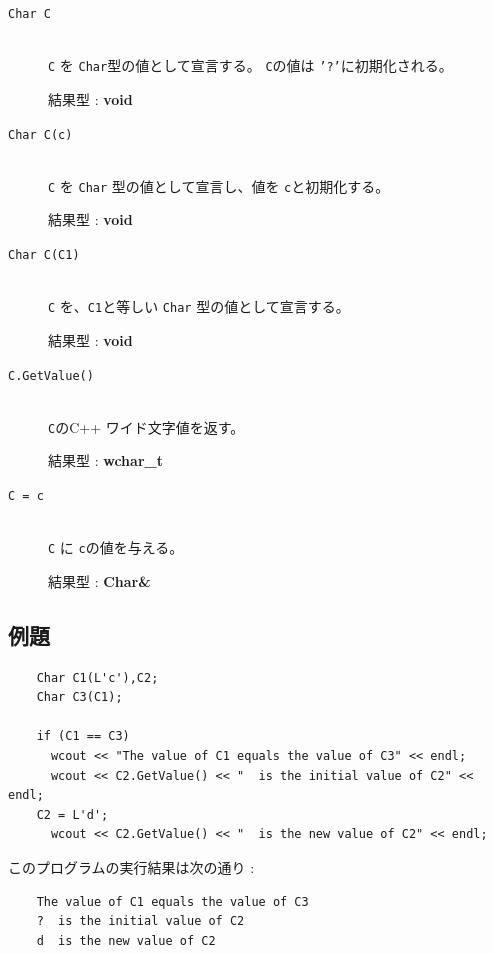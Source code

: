 \documentclass[\pformat,12pt]{jarticle}
\begin{document}
\vspace{0.5cm}

\begin{description}
\item[{\tt Char C}] \mbox{}\\
      {\tt C} を {\tt Char}型の値として宣言する。 {\tt C}の値は {\tt '?'}に初期化される。

     結果型 : {\bf void}

\item[{\tt Char C(c)}] \mbox{}\\
      {\tt C} を {\tt Char} 型の値として宣言し、値を {\tt c}と初期化する。

     結果型 : {\bf void}

\item[{\tt Char C(C1)}] \mbox{}\\
      {\tt C} を、{\tt C1}と等しい {\tt Char} 型の値として宣言する。

     結果型 : {\bf void}

\item[{\tt C.GetValue()}] \mbox{}\\
     {\tt C}のC++ ワイド文字値を返す。

     結果型 : {\bf wchar\_t}
     
\item[{\tt C = c}] \mbox{}\\
     {\tt C} に {\tt c}の値を与える。

     結果型 : {\bf Char\&}
\end{description}

\subsection*{例題}

\begin{verbatim}
    Char C1(L'c'),C2;
    Char C3(C1);

    if (C1 == C3)
      wcout << "The value of C1 equals the value of C3" << endl;
      wcout << C2.GetValue() << "  is the initial value of C2" << endl;
    C2 = L'd';
      wcout << C2.GetValue() << "  is the new value of C2" << endl;
\end{verbatim}

\noindent このプログラムの実行結果は次の通り :

\begin{verbatim}
    The value of C1 equals the value of C3
    ?  is the initial value of C2
    d  is the new value of C2
\end{verbatim}
\end{document}
